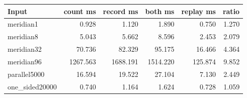 \begin{center}
\begin{tabular}{@{}lrrrrr@{}}
\toprule
Input & count ms & record ms & both ms & replay ms & ratio \\
\midrule
meridian1 & 0.928 & 1.120 & 1.890 & 0.750 & 1.270 \\
meridian8 & 5.043 & 5.662 & 8.596 & 2.453 & 2.079 \\
meridian32 & 70.736 & 82.329 & 95.175 & 16.466 & 4.364 \\
meridian96 & 1267.563 & 1688.191 & 1514.220 & 125.874 & 9.852 \\
parallel5000 & 16.594 & 19.522 & 27.104 & 7.130 & 2.449 \\
one\_sided20000 & 0.740 & 1.164 & 1.624 & 0.728 & 1.059 \\
\bottomrule
\end{tabular}
\end{center}
